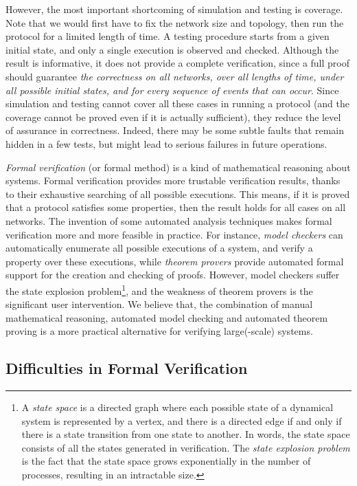 \documentclass[a4paper,10pt,twocolumn]{article}
\begin{document}
However, the most important shortcoming of simulation and testing is coverage. Note that we would first have to fix the network size and topology, then run the protocol for a limited length of time. A testing procedure starts from a given initial state, and only a single execution is observed and checked. Although the result is informative, it does not provide a complete verification, since a full proof should guarantee \emph{the correctness on all networks, over all lengths of time, under all possible initial states, and for every sequence of events that can occur}. Since simulation and testing cannot cover all these cases in running a protocol (and the coverage cannot be proved even if it is actually sufficient), they reduce the level of assurance in correctness. Indeed, there may be some subtle faults that remain hidden in a few tests, but might lead to serious failures in future operations.

\emph{Formal verification} (or formal method) is a kind of mathematical reasoning about systems. Formal verification provides more trustable verification results, thanks to their exhaustive searching of all possible executions. This means, if it is proved that a protocol satisfies some properties, then the result holds for all cases on all networks. The invention of some automated analysis techniques makes formal verification more and more feasible in practice. For instance, \emph{model checkers} \cite{CGP00,BK08} can automatically enumerate all possible executions of a system, and verify a property over these executions, while \emph{theorem provers} \cite{GM93} provide automated formal support for the creation and checking of proofs. However, model checkers suffer the state explosion problem\footnote{A \emph{state space} is a directed graph where each possible state of a dynamical system is represented by a vertex, and there is a directed edge if and only if there is a state transition from one state to another. In words, the state space consists of all the states generated in verification. The \emph{state explosion problem} is the fact that the state space grows exponentially in the number of processes, resulting in an intractable size.}, and the weakness of theorem provers is the significant user intervention. We believe that, the combination of manual mathematical reasoning, automated model checking and automated theorem proving is a more practical alternative for verifying large(-scale) systems.

\subsection{Difficulties in Formal Verification}
\end{document}

